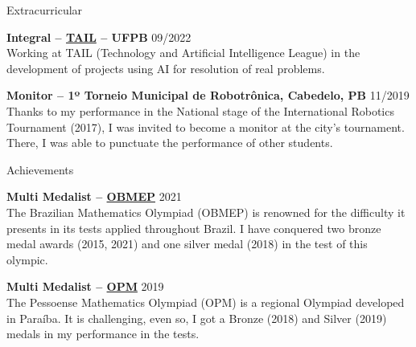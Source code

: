 \documentclass{resume} %
\begin{document}
\begin{rSection}{Extracurricular} \itemsep -1pt {}
	
	\item \textbf{Integral – \href{https://www.instagram.com/tailufpb/}{TAIL} – UFPB} \hfill 09/2022 \\
	Working at TAIL (Technology and Artificial Intelligence League) in the development of projects using AI for resolution of real problems.
	
	\item \textbf{Monitor – 1º Torneio Municipal de Robotrônica, Cabedelo, PB} \hfill 11/2019 \\
	Thanks to my performance in the National stage of the International Robotics Tournament (2017), I was invited to become a monitor at the city's tournament. There, I was able to punctuate the performance of other students. 
\end{rSection}






\begin{rSection}{Achievements}
	
	\item \textbf{Multi Medalist –  \href{http://www.obmep.org.br/}{OBMEP}} \hfill 2021 \\
	The Brazilian Mathematics Olympiad (OBMEP) is renowned for the difficulty it presents in its tests applied throughout Brazil. I have conquered two bronze medal awards (2015, 2021) and one silver medal (2018) in the test of this olympic.
	
	\item \textbf{Multi Medalist – \href{http://www.mat.ufpb.br/opm/}{OPM}} \hfill 2019 \\
	The Pessoense Mathematics Olympiad (OPM) is a regional Olympiad developed in Paraíba. It is challenging, even so, I got a Bronze (2018) and Silver (2019) medals in my performance in the tests.
	
\end{rSection}
\end{document}
